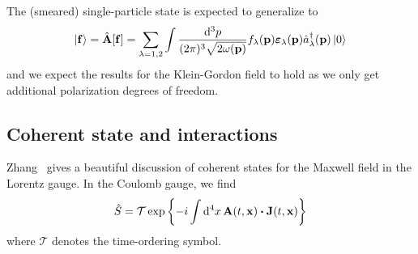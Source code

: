 The (smeared) single-particle state is expected to generalize to
\begin{equation}
	\ket{\vb{f}}
	=
	\hat{\vb{A}}[\vb{f}]
	=
	\sum_{\lambda=1,2}
	\int\frac{\dd[3]{p}}{(2\pi)^3\sqrt{2\omega(\vb{p})}}
	f_\lambda(\vb{p})
	\boldsymbol{\varepsilon}_\lambda(\vb{p})
	\hat{a}_\lambda^\dagger(\vb{p})
	\ket{0}
\end{equation}
and we expect the results for the Klein-Gordon field to hold as we only get additional polarization degrees of freedom.

\subsection{Coherent state and interactions}

Zhang~\cite{Zhang1999} gives a beautiful discussion of coherent states for the Maxwell field in the Lorentz gauge.
In the Coulomb gauge, we find
\begin{equation}
	\hat{S}
	=
	\mathcal{T}
	\exp\left\{
		-i\int\dd[4]{x}
		\vb{A}(t,\vb{x})\vdot\vb{J}(t,\vb{x})
	\right\}
\end{equation}
where $\mathcal{T}$ denotes the time-ordering symbol.
